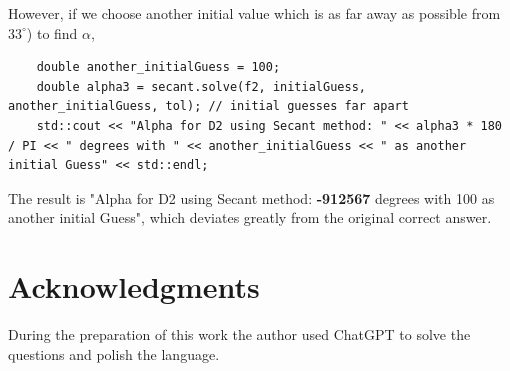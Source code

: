 \documentclass{article}
\begin{document}
\begin{CJK}{UTF8}{gbsn}
However, if we choose another initial value which is as far away as possible from $33^{\circ}$) to find $\alpha$, 

\begin{verbatim}
    double another_initialGuess = 100;
    double alpha3 = secant.solve(f2, initialGuess, another_initialGuess, tol); // initial guesses far apart
    std::cout << "Alpha for D2 using Secant method: " << alpha3 * 180 / PI << " degrees with " << another_initialGuess << " as another initial Guess" << std::endl;
\end{verbatim}

The result is "Alpha for D2 using Secant method: \textbf{-912567} degrees with 100 as another initial Guess", which deviates greatly from the original correct answer.



\section*{Acknowledgments}
During the preparation of this work the author used ChatGPT to solve the questions and polish the language.

%
%

\end{CJK}
\end{document}
